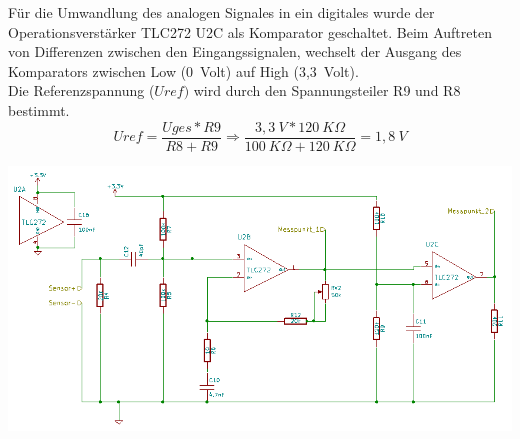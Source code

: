 Für die Umwandlung des analogen Signales in ein digitales wurde der Operationsverstärker TLC272 U2C als Komparator geschaltet. Beim Auftreten von Differenzen zwischen den Eingangssignalen, wechselt der Ausgang des Komparators zwischen Low (0~Volt) auf High (3,3~Volt).\\ Die Referenzspannung (\(\displaystyle Uref)\)  wird durch den Spannungsteiler R9 und R8 bestimmt.
\onehalfspacing \\
\[\displaystyle Uref=\frac{Uges*R9}{R8+R9}\Rightarrow\frac{3,3~V*120~K\Omega}{100~K\Omega+120~K\Omega}=1,8~V \]
\singlespacing
\begin{center}
\begin{minipage}{1\textwidth}
\includegraphics[width=1\textwidth%
]{Abbildungen/Empfaenger.png}
\label{fig:Empfaengerschaltung}
\end{minipage}\\
\end{center}

